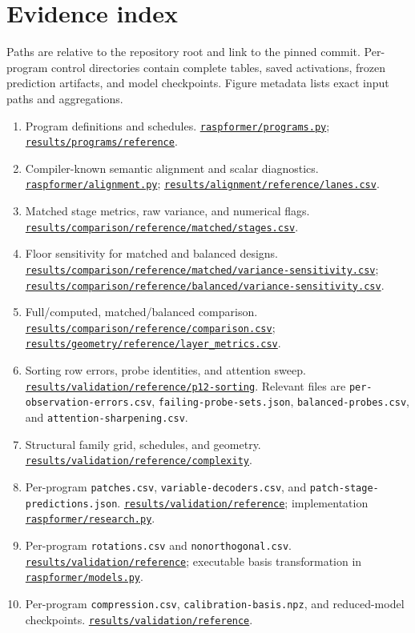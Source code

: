 \documentclass[10pt,a4paper]{article}
\newcommand{\newsection}[1]{\clearpage\section{#1}}
\newcommand{\repopath}[1]{\href{https://github.com/raghulchandramouli/RaspFormer/blob/e06479ce09f10695aa5280162f80d880c060eaf5/#1}{\nolinkurl{#1}}}
\newcommand{\repodir}[1]{\href{https://github.com/raghulchandramouli/RaspFormer/tree/e06479ce09f10695aa5280162f80d880c060eaf5/#1}{\nolinkurl{#1}}}
\begin{document}
\newsection{Evidence index}
Paths are relative to the repository root and link to the pinned commit. Per-program control directories contain complete tables, saved activations, frozen prediction artifacts, and model checkpoints. Figure metadata lists exact input paths and aggregations.
\begingroup\small\raggedright
\begin{enumerate}[label=E\arabic*.,ref=E\arabic*,itemsep=7pt]
\item\label{src:programs} Program definitions and schedules. \repopath{raspformer/programs.py}; \repodir{results/programs/reference}.
\item\label{src:alignment} Compiler-known semantic alignment and scalar diagnostics. \repopath{raspformer/alignment.py}; \repopath{results/alignment/reference/lanes.csv}.
\item\label{src:stages} Matched stage metrics, raw variance, and numerical flags. \repopath{results/comparison/reference/matched/stages.csv}.
\item\label{src:floor} Floor sensitivity for matched and balanced designs. \repopath{results/comparison/reference/matched/variance-sensitivity.csv}; \repopath{results/comparison/reference/balanced/variance-sensitivity.csv}.
\item\label{src:comparison} Full/computed, matched/balanced comparison. \repopath{results/comparison/reference/comparison.csv}; \repopath{results/geometry/reference/layer_metrics.csv}.
\item\label{src:sorting} Sorting row errors, probe identities, and attention sweep. \repodir{results/validation/reference/p12-sorting}. Relevant files are \texttt{per-observation-errors.csv}, \texttt{failing-probe-sets.json}, \texttt{balanced-probes.csv}, and \texttt{attention-sharpening.csv}.
\item\label{src:complexity} Structural family grid, schedules, and geometry. \repodir{results/validation/reference/complexity}.
\item\label{src:patches} Per-program \texttt{patches.csv}, \texttt{variable-decoders.csv}, and \texttt{patch-stage-predictions.json}. \repodir{results/validation/reference}; implementation \repopath{raspformer/research.py}.
\item\label{src:rotation} Per-program \texttt{rotations.csv} and \texttt{nonorthogonal.csv}. \repodir{results/validation/reference}; executable basis transformation in \repopath{raspformer/models.py}.
\item\label{src:compression} Per-program \texttt{compression.csv}, \texttt{calibration-basis.npz}, and reduced-model checkpoints. \repodir{results/validation/reference}.

\end{enumerate}
\end{document}
